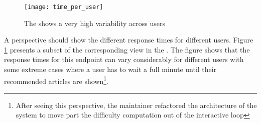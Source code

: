 \begin{figure}[h!]
  \centering
  \texttt{[image: time\_per\_user]}
  \caption{The \epFeedItems shows a very high variability across users}
  \label{fig:tpu}
\end{figure}


A  perspective should show the different response times for different users. Figure \ref{fig:tpu} presents a subset of the corresponding view in the \tool. The figure shows that the response times for this endpoint can vary considerably for different users with some extreme cases where a user has to wait a full minute until their recommended articles are shown\footnote{After seeing this perspective, the maintainer refactored the architecture of the system to move part the difficulty computation out of the interactive loop}.






